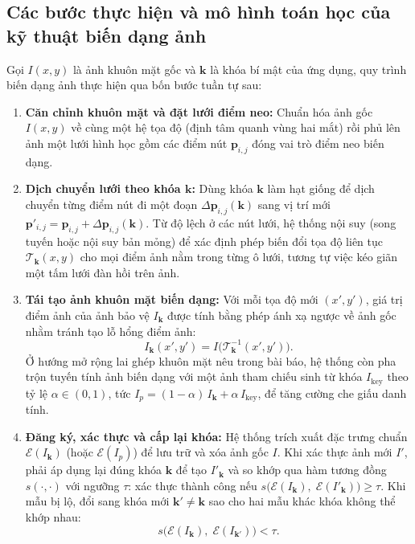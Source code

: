 \subsection*{Các bước thực hiện và mô hình toán học của kỹ thuật biến dạng ảnh}
Gọi $I(x, y)$ là ảnh khuôn mặt gốc và $\mathbf{k}$ là khóa bí mật của ứng dụng, quy trình biến dạng ảnh thực hiện qua bốn bước tuần tự sau:
\begin{enumerate}\setlength{\itemsep}{2pt}\setlength{\parskip}{0pt}
    \item \textbf{Căn chỉnh khuôn mặt và đặt lưới điểm neo:} Chuẩn hóa ảnh gốc $I(x, y)$ về cùng một hệ tọa độ (định tâm quanh vùng hai mắt) rồi phủ lên ảnh một lưới hình học gồm các điểm nút $\mathbf{p}_{i,j}$ đóng vai trò điểm neo biến dạng.
    \item \textbf{Dịch chuyển lưới theo khóa $\mathbf{k}$:} Dùng khóa $\mathbf{k}$ làm hạt giống để dịch chuyển từng điểm nút đi một đoạn $\Delta \mathbf{p}_{i,j}(\mathbf{k})$ sang vị trí mới $\mathbf{p}'_{i,j} = \mathbf{p}_{i,j} + \Delta \mathbf{p}_{i,j}(\mathbf{k})$. Từ độ lệch ở các nút lưới, hệ thống nội suy (song tuyến hoặc nội suy bản mỏng) để xác định phép biến đổi tọa độ liên tục $\mathcal{T}_{\mathbf{k}}(x, y)$ cho mọi điểm ảnh nằm trong từng ô lưới, tương tự việc kéo giãn một tấm lưới đàn hồi trên ảnh.
    \item \textbf{Tái tạo ảnh khuôn mặt biến dạng:} Với mỗi tọa độ mới $(x', y')$, giá trị điểm ảnh của ảnh bảo vệ $I_{\mathbf{k}}$ được tính bằng phép ánh xạ ngược về ảnh gốc nhằm tránh tạo lỗ hổng điểm ảnh:
    \[
    I_{\mathbf{k}}(x', y') = I\bigl(\mathcal{T}_{\mathbf{k}}^{-1}(x', y')\bigr).
    \]
    Ở hướng mở rộng lai ghép khuôn mặt nêu trong bài báo, hệ thống còn pha trộn tuyến tính ảnh biến dạng với một ảnh tham chiếu sinh từ khóa $I_{\text{key}}$ theo tỷ lệ $\alpha \in (0, 1)$, tức $I_p = (1 - \alpha)\, I_{\mathbf{k}} + \alpha\, I_{\text{key}}$, để tăng cường che giấu danh tính.
    \item \textbf{Đăng ký, xác thực và cấp lại khóa:} Hệ thống trích xuất đặc trưng chuẩn $\mathcal{E}(I_{\mathbf{k}})$ (hoặc $\mathcal{E}(I_p)$) để lưu trữ và xóa ảnh gốc $I$. Khi xác thực ảnh mới $I'$, phải áp dụng lại đúng khóa $\mathbf{k}$ để tạo $I'_{\mathbf{k}}$ và so khớp qua hàm tương đồng $s(\cdot, \cdot)$ với ngưỡng $\tau$: xác thực thành công nếu $s\bigl(\mathcal{E}(I_{\mathbf{k}}),\; \mathcal{E}(I'_{\mathbf{k}})\bigr) \ge \tau$. Khi mẫu bị lộ, đổi sang khóa mới $\mathbf{k}' \neq \mathbf{k}$ sao cho hai mẫu khác khóa không thể khớp nhau:
    \[
    s\bigl(\mathcal{E}(I_{\mathbf{k}}),\; \mathcal{E}(I_{\mathbf{k}'})\bigr) < \tau.
    \]
\end{enumerate}

